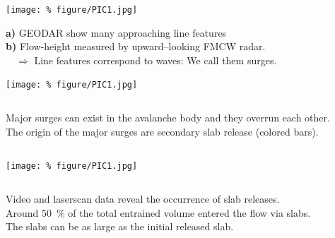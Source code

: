 \documentclass[unknownkeysallowed,usepdftitle=false]{beamer}
\newcommand{\secvariable}{nothing}
\newcommand{\mysection}[1]{\renewcommand{\secvariable}{#1}
}
\begin{document}
\mysection{line}
\begin{frame}\label{\secvariable}
\begin{center}
  \vspace{-0.5cm}
 \texttt{[image: \%
  figure/PIC1.jpg]}
\end{center}
  \vspace{-0.5cm}
  \textbf{a)} GEODAR show many approaching line features\\
  \textbf{b)} Flow-height measured by upward--looking FMCW radar.\\
  $\quad \Rightarrow$ Line features correspond to waves: We call them surges.
  
\end{frame}

\mysection{major}
\begin{frame}\label{\secvariable} %
\begin{center}
\texttt{[image: \%
figure/PIC1.jpg]}
\end{center}
\begin{columns}
\begin{column}[t]{1.1\textwidth}
 Major surges can exist in the avalanche body and they overrun each other.\\
 The origin of the major surges are secondary slab release (colored bars).
\end{column}
\end{columns}
\end{frame}

\mysection{slab}
\begin{frame}\label{\secvariable}
\texttt{[image: \%
figure/PIC1.jpg]}
\begin{columns}
\begin{column}[t]{1.1\textwidth}
 Video and laserscan data reveal the occurrence of slab releases.\\
 Around \SI{50}{\percent} of the total entrained volume entered the flow via
slabs.\\
  The slabs can be as large as the initial released slab.
\hyperlink{slabtable}{}
\end{column}
\end{columns}
\end{frame}
\end{document}
